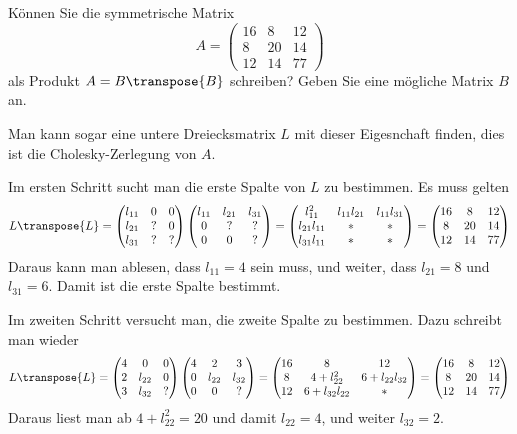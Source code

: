 Können Sie die symmetrische Matrix
\[
A=\begin{pmatrix}
16& 8&12\\
 8&20&14\\
12&14&77
\end{pmatrix}
\]
als Produkt $A=B\transpose{B}$ schreiben? Geben Sie eine mögliche Matrix $B$ an.


\begin{loesung}
Man kann sogar eine untere Dreiecksmatrix $L$ mit dieser Eigesnchaft finden,
dies ist die Cholesky-Zerlegung von $A$.

Im ersten Schritt sucht man die erste Spalte von $L$ zu bestimmen.
Es muss gelten
\[
L\transpose{L}=
\begin{pmatrix}
l_{11}&  0&  0\\
l_{21}&  ?&  0\\
l_{31}&  ?&  ?
\end{pmatrix}
\begin{pmatrix}
l_{11}&l_{21}&l_{31}\\
     0&     ?&     ?\\
     0&     0&     ?
\end{pmatrix}
=
\begin{pmatrix}
    l_{11}^2&l_{11}l_{21}&l_{11}l_{31}\\
l_{21}l_{11}&           *&           *\\
l_{31}l_{11}&           *&           *
\end{pmatrix}
=
\begin{pmatrix}
16& 8& 12\\
 8&20& 14\\
12&14& 77
\end{pmatrix}
\]
Daraus kann man ablesen, dass $l_{11}=4$ sein muss, und weiter,
dass
$l_{21}=8$ und $l_{31}=6$. Damit ist die erste Spalte bestimmt.

Im zweiten Schritt versucht man, die zweite Spalte zu bestimmen.
Dazu schreibt man wieder
\[
L\transpose{L}
=
\begin{pmatrix}
4&     0&0\\
2&l_{22}&0\\
3&l_{32}&?
\end{pmatrix}
\begin{pmatrix}
4&     2&     3\\
0&l_{22}&l_{32}\\
0&     0&?
\end{pmatrix}
=
\begin{pmatrix}
16&              8&            12\\
 8& 4+l_{22}^2    &6+l_{22}l_{32}\\
12& 6+l_{32}l_{22}&             *
\end{pmatrix}
=
\begin{pmatrix}
16& 8& 12\\
 8&20& 14\\
12&14& 77
\end{pmatrix}
\]
Daraus liest man ab $4+l_{22}^2=20$ und damit $l_{22}=4$, und weiter
$l_{32}=2$.


\end{loesung}
